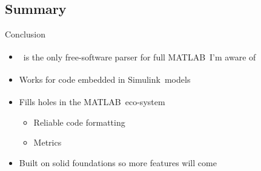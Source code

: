 \documentclass{beamer}
\newcommand{\mh}[0]{{\sc\structure{Miss\_Hit}}}
\newcommand{\matlab}[0]{MATLAB\textsuperscript{\tiny\textregistered}}
\newcommand{\simulink}[0]{Simulink\textsuperscript{\tiny\textregistered}}
\begin{document}
\subsection{Summary}
\begin{frame}{Conclusion}
  \begin{itemize}
  \item \mh~is the only free-software parser for full \matlab\ I'm
    aware of
  \item Works for code embedded in \simulink\ models
  \item Fills holes in the \matlab\ eco-system
    \begin{itemize}
    \item Reliable code formatting
    \item Metrics
    \end{itemize}
  \item Built on solid foundations so more features will come
  \end{itemize}

  \vspace{12pt}

\end{frame}
\end{document}
